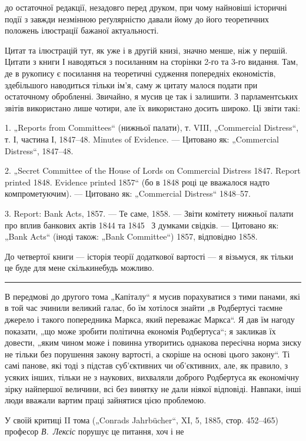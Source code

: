 \parcont{}  %
до остаточної редакції, незадовго перед друком, при чому найновіші
історичні події з завжди незмінною реґулярністю давали
йому до його теоретичних положень ілюстрації бажаної актуальності.

Цитат та ілюстрацій тут, як уже і в другій книзі, значно
менше, ніж у першій. Цитати з книги І наводяться з посиланням
на сторінки 2-го та 3-го видання. Там, де в рукопису є
посилання на теоретичні судження попередніх економістів, здебільшого
наводиться тільки ім’я, саму ж цитату малося подати
при остаточному обробленні. Звичайно, я мусив це так і залишити.
З парламентських звітів використано лише чотири, але
їх використано досить широко. Ці звіти такі:

1. „Reports from Committees“ (нижньої палати), т. VIII, „\textenglish{Commercial
Distress}“, т. І, частина І, 1847--48. Minutes of Evidence. —
Цитовано як: „\textenglish{Commercial Distress}“, 1847--48.

2. „Secret Committee of the House of Lords on Commercial Distress
1847. Report printed 1848. Evidence printed 1857“ (бо в 1848 році
це вважалося надто компрометуючим). — Цитовано як: „Commercial
Distress“ 1848--57.

3. Report: Bank Acts, 1857. — Те саме, 1858. — Звіти комітету
нижньої палати про вплив банкових актів 1844 та 1845~
З думками свідків. — Цитовано як: „Bank Acts“ (іноді також:
„Bank Committee“) 1857, відповідно 1858.

До четвертої книги — історія теорії додаткової вартості —
я візьмуся, як тільки це буде для мене скількинебудь можливо.

\pfbreak

В передмові до другого тома „Капіталу“ я мусив порахуватися
з тими панами, які в той час зчинили великий галас, бо
їм хотілося знайти „в Родбертусі таємне джерело і такого попередника
Маркса, який переважає Маркса“. Я дав їм нагоду
показати, „що може зробити політична економія Родбертуса“;
я закликав їх довести, „яким чином може і повинна утворитись
однакова пересічна норма зиску не тільки без порушення закону
вартості, а скоріше на основі цього закону“. Ті самі панове,
які тоді з підстав суб’єктивних чи об’єктивних, але, як правило,
з усяких інших, тільки не з наукових, вихваляли доброго Родбертуса
як економічну зірку найпершої величини, всі без винятку
не дали ніякої відповіді. Навпаки, інші люди вважали
вартим праці зайнятися цією проблемою.

У своїй критиці II тома („Conrads Jahrbücher“, XI, 5, 1885,
стор. 452--465) професор \emph{В.~Лексіс} порушує це питання, хоч і не
\parbreak{}  %
